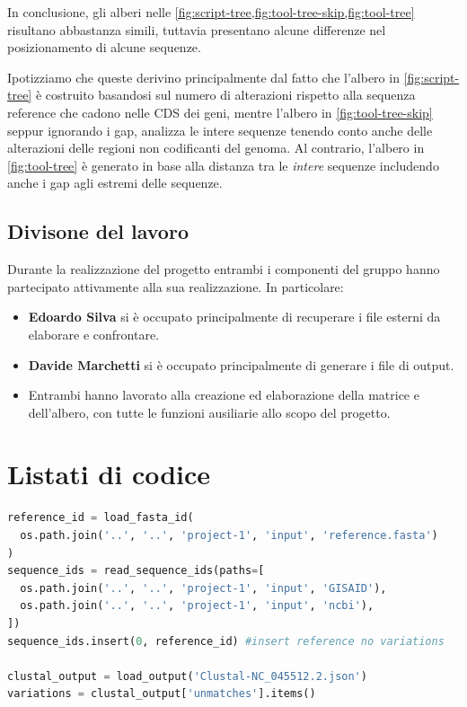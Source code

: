 \documentclass[11pt,italian]{article}
\begin{document}
\vspace{2mm}
\noindent
In conclusione, gli alberi nelle \cref{fig:script-tree,fig:tool-tree-skip,fig:tool-tree} risultano abbastanza simili, tuttavia presentano alcune differenze nel posizionamento di alcune sequenze.

Ipotizziamo che queste derivino principalmente dal fatto che l'albero in \cref{fig:script-tree} è costruito basandosi sul numero di alterazioni rispetto alla sequenza reference che cadono nelle CDS dei geni, mentre l'albero in \cref{fig:tool-tree-skip} seppur ignorando i gap, analizza le intere sequenze tenendo conto anche delle alterazioni delle regioni non codificanti del genoma.
Al contrario, l'albero in \cref{fig:tool-tree} è generato in base alla distanza tra le \textit{intere} sequenze includendo anche i gap agli estremi delle sequenze.

\subsection{Divisone del lavoro}
Durante la realizzazione del progetto entrambi i componenti del gruppo hanno partecipato attivamente alla sua realizzazione. In particolare:
\begin{itemize}
  \item \textbf{Edoardo Silva} si è occupato principalmente di recuperare i file esterni da elaborare e confrontare.
  \item \textbf{Davide Marchetti} si è occupato principalmente di generare i file di output.
  \item Entrambi hanno lavorato alla creazione ed elaborazione della matrice e dell'albero, con tutte le funzioni ausiliarie allo scopo del progetto.
\end{itemize}

\newpage
\section{Listati di codice}
\begin{lstlisting}[language=Python,caption=Caricamento dei file necessari per l'elaborazione,label=code:read_input_files]
reference_id = load_fasta_id(
  os.path.join('..', '..', 'project-1', 'input', 'reference.fasta')
)
sequence_ids = read_sequence_ids(paths=[
  os.path.join('..', '..', 'project-1', 'input', 'GISAID'),
  os.path.join('..', '..', 'project-1', 'input', 'ncbi'),
])
sequence_ids.insert(0, reference_id) #insert reference no variations

clustal_output = load_output('Clustal-NC_045512.2.json')
variations = clustal_output['unmatches'].items()
\end{lstlisting}
\end{document}

